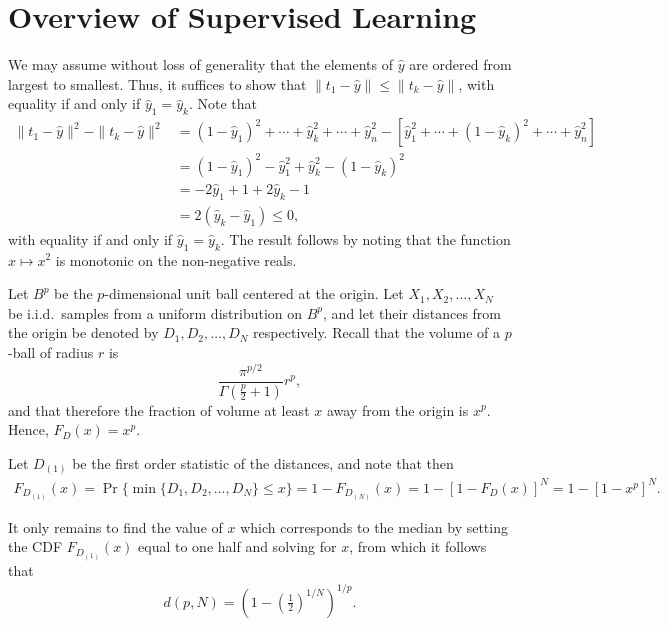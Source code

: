 \chapter{Overview of Supervised Learning}

\begin{ex}
  We may assume without loss of generality that the elements of $\hat{y}$ are
  ordered from largest to smallest. Thus, it suffices to show that
  $\|t_1-\hat{y}\|\leq \|t_k-\hat{y}\|$, with equality if and only
  if $\hat{y}_1=\hat{y}_k$. Note that
  \begin{align*}
    \|t_1-\hat{y}\|^2-\|t_k-\hat{y}\|^2
     & =(1-\hat{y}_1)^2+\cdots+\hat{y}_k^2+\cdots+\hat{y}_n^2
    -\left[\hat{y}_1^2+\cdots+(1-\hat{y}_k)^2+\cdots+\hat{y}_n^2\right] \\
     & =(1-\hat{y}_1)^2-\hat{y}_1^2+\hat{y}_k^2-(1-\hat{y}_k)^2         \\
     & =-2\hat{y}_1 + 1+2\hat{y}_k -1                                   \\
     & =2(\hat{y}_k - \hat{y}_1)
    \leq 0,
  \end{align*}
  with equality if and only if $\hat{y}_1=\hat{y}_k$. The result follows
  by noting that the function $x\mapsto x^2$ is monotonic on the non-negative
  reals.
\end{ex}

\begin{ex}
\end{ex}

\begin{ex}
  Let $B^p$ be the $p$-dimensional unit ball centered at the origin. Let
  $X_{1}, X_2, \ldots, X_N$ be i.i.d.\ samples from a uniform distribution
  on $B^p$, and let their distances from the origin be denoted by
  $D_1, D_2, \ldots, D_N$ respectively. Recall that the volume of a $p$-ball
  of radius $r$ is
  $$
    \frac{\pi^{p/2}}{\Gamma(\frac{p}{2}+1)}r^p,
  $$
  and that therefore the fraction of volume at least $x$ away from the origin
  is $x^p$. Hence, $F_D(x)=x^p$.

  Let $D_{(1)}$ be the first order statistic of the distances, and note that
  then
  \begin{align*}
    F_{D_{(1)}}(x)=\Pr\{\min\{D_1, D_2, \ldots, D_N \} \leq x\}
    =1-F_{D_{(N)}}(x)
    =1-\left[1-F_D(x)\right]^N
    =1-\left[1-x^p\right]^N.
  \end{align*}

  It only remains to find the value of $x$ which corresponds to the median by
  setting the CDF $F_{D_{(1)}}(x)$ equal to one half and solving for $x$, from
  which it follows that
  \begin{align*}
    d(p,N)=\left(1-\left(\frac{1}{2}\right)^{1/N}\right)^{1/p}.
  \end{align*}
\end{ex}

